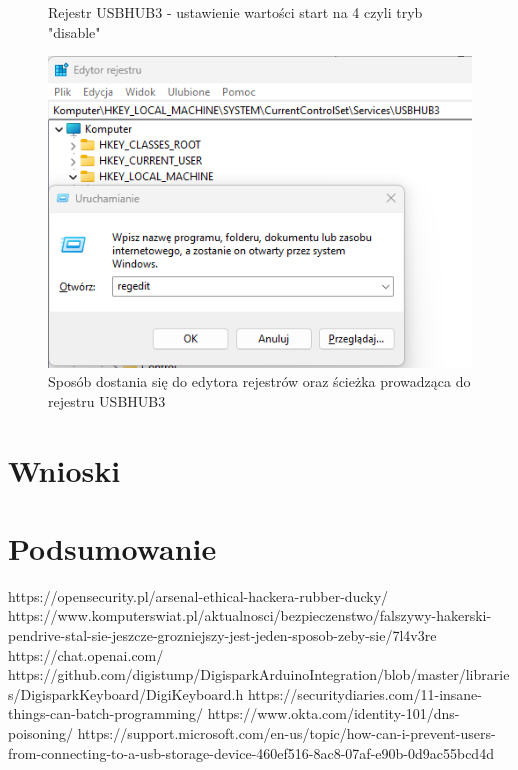 \documentclass{article}
\begin{document}
\begin{itemize}
\begin{figure}[h]
    \caption{Rejestr USBHUB3 - ustawienie wartości start na 4 czyli tryb "disable"}
    \label{fig:enter-label}
    \end{figure}
    \begin{figure}[h]
    \centering
    \includegraphics[scale=0.5]{Media/Rejestr1.png}
    \caption{Sposób dostania się do edytora rejestrów oraz ścieżka prowadząca do rejestru USBHUB3}
    \label{fig:enter-label}
    \end{figure}
    \end{itemize} 
    
        

\section{Wnioski}


\section{Podsumowanie}


\begin{thebibliography}{9}

\bibitem{}
  https://opensecurity.pl/arsenal-ethical-hackera-rubber-ducky/
 \bibitem{} https://www.komputerswiat.pl/aktualnosci/bezpieczenstwo/falszywy-hakerski-pendrive-stal-sie-jeszcze-grozniejszy-jest-jeden-sposob-zeby-sie/7l4v3re
 \bibitem{} https://chat.openai.com/
 \bibitem{} https://github.com/digistump/DigisparkArduinoIntegration/blob/master/libraries/DigisparkKeyboard/DigiKeyboard.h
 \bibitem{} https://securitydiaries.com/11-insane-things-can-batch-programming/
 \bibitem{} https://www.okta.com/identity-101/dns-poisoning/
 \bibitem{} https://support.microsoft.com/en-us/topic/how-can-i-prevent-users-from-connecting-to-a-usb-storage-device-460ef516-8ac8-07af-e90b-0d9ac55bcd4d
\end{thebibliography}
\end{document}
